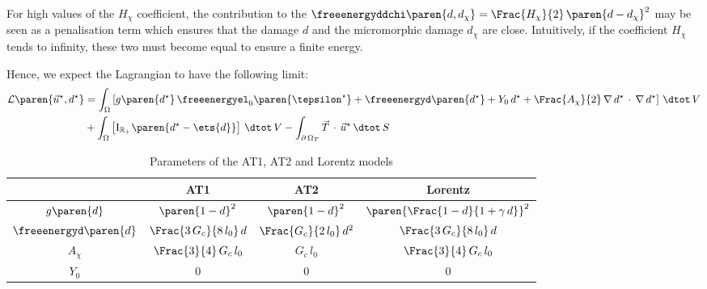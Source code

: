For high values of the $H_{\chi}$ coefficient, the contribution to the
\(\freeenergyddchi\paren{d,
d_{\chi}}=\Frac{H_{\chi}}{2}\,\paren{d-d_{\chi}}^{2}\) may be seen as a
penalisation term which ensures that the damage $d$ and the
micromorphic damage $d_{\chi}$ are close. Intuitively, if the
coefficient $H_{\chi}$ tends to infinity, these two must become
equal to ensure a finite energy.

Hence, we expect the Lagrangian to have the following limit:
%
%
%
\begin{equation}
  \label{eq:micromorphicdamage:LagrangianLimit}
  \begin{aligned}
  \mathcal{L}\paren{\vec{u}^{\star},d^{\star}}
  &=\int_{\Omega}
  \left[
  g\paren{d^{\star}}\,\freeenergyel_{0}\paren{\tepsilon^{\star}}+
  \freeenergyd\paren{d^{\star}}+
  Y_{0}\,d^{\star}
  +\Frac{A_{\chi}}{2}\,\nabla\, d^{\star}\,\cdot\,\nabla\, d^{\star}
  \right]
  \,\dtot\,V\\
  &+\int_{\Omega}
  \left[
  \mathrm{I}_{\mathbb{R}_{+}}\paren{d^{\star}-\ets{d}} 
  \right]
  \,\dtot\,V
  - \int_{\partial\,\Omega_{T}} \vec{T}\,\cdot\,\vec{u}^{\star} \,\dtot\,S
  \end{aligned}
\end{equation}

\begin{table}[H]
    \centering
    \begin{tabular}{||c c c c||} 
        \hline
         & AT1 & AT2 & Lorentz
        \\
        [0.5ex] 
        \hline\hline
        $g\paren{d}$            & $\paren{1-d}^{2}$              & $\paren{1-d}^{2}$               & $\paren{\Frac{1-d}{1+\gamma\,d}}^{2}$  
        \\
        $\freeenergyd\paren{d}$ & $\Frac{3\,G_{c}}{8\,l_{0}}\,d$ & $\Frac{G_{c}}{2\,l_{0}}\,d^{2}$ & $\Frac{3\,G_{c}}{8\,l_{0}}\,d$         
        \\
        $A_{\chi}$              & $\Frac{3}{4}\,G_{c}\,l_{0}$    & $G_{c}\,l_{0}$                  & $\Frac{3}{4}\,G_{c}\,l_{0}$    
        \\
        $Y_{0}$                 & $0$                            & $0$                             &  $0$   
        \\
        \hline
    \end{tabular}
    \caption{Parameters of the AT1, AT2 and Lorentz models}
    \label{tbl:micromorphicdamage:ATparameters}
\end{table}

